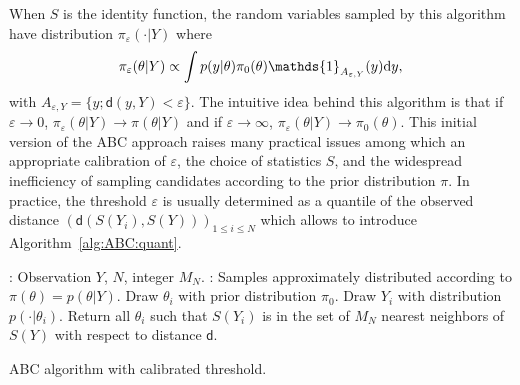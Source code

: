 \documentclass[english,graybox,envcountchap,envcountsame,sectrefs,shortlabels]{svmono}
\theoremstyle{style}
\newcommand{\eqsp}{}
\begin{document}
\medskip

When $S$ is the identity function, the random variables sampled by this  algorithm have distribution $\pi_{\varepsilon}(\cdot |Y)$ where
$$
\pi_{\varepsilon}(\theta|Y)\propto \int p(y|\theta)\pi_0(\theta) \mathds{1}_{A_{\varepsilon,Y}}(y)\rmd y\eqsp,
$$
with $A_{\varepsilon,Y} = \{y\eqsp;\mathsf{d}(y,Y)<\varepsilon\eqsp\}$. The intuitive idea behind this algorithm is that if  $\varepsilon \to 0$, $\pi_{\varepsilon}(\theta|Y) \to \pi(\theta|Y)$ and if $\varepsilon \to \infty$, $\pi_{\varepsilon}(\theta|Y) \to \pi_0(\theta)$. This initial version of the ABC approach raises many practical  issues among which an appropriate calibration of $\varepsilon$, the choice of statistics $S$, and the widespread inefficiency of sampling candidates according to the prior distribution $\pi$. In practice, the threshold $\varepsilon$ is usually determined as a quantile of the observed distance $(\mathsf{d}(S(Y_i),S(Y)))_{1\leqslant i \leqslant N}$ which allows to introduce Algorithm~\ref{alg:ABC:quant}.

\medskip

\begin{algorithm}
\centering
\begin{algorithmic}
: Observation $Y$, $N$, integer $M_N$.
: Samples approximately distributed according to $\pi(\theta)= p(\theta | Y)$.
\State Draw $\theta_i$ with prior distribution $\pi_0$.
\State Draw $Y_i$ with distribution  $p(\cdot |\theta_i)$.
\EndFor
\State Return all $\theta_i$ such that $S(Y_i)$ is in the set of $M_N$ nearest neighbors of $S(Y)$ with respect to distance $\mathsf{d}$.
\end{algorithmic}
\label{alg:ABC:quant}
\caption{ABC algorithm with calibrated threshold.}
\end{algorithm}
%
%

\medskip
\end{document}
